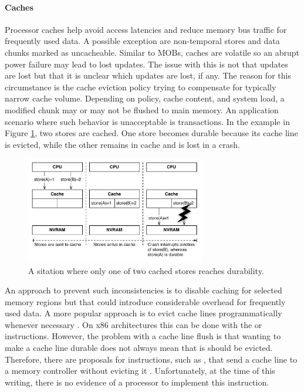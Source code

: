\paragraph{Caches}

Processor caches help avoid access latencies and reduce memory bus traffic for
frequently used data. A possible exception are non-temporal stores and data
chunks marked as uncacheable. Similar to \acp{MOB}, caches are
volatile so an abrupt power failure may lead to lost updates. The issue with
this is not that updates are lost but that it is unclear which updates are lost,
if any. The reason for this circumstance is the cache eviction policy trying to
compensate for typically narrow cache volume. Depending on policy, cache
content, and system load, a modified chunk may or may not be flushed to main
memory. An application scenario where such behavior is unacceptable is
transactions. In the example in Figure \ref{fig:nvram-cache-crash}, two stores are cached. One store becomes durable because its cache line is evicted, while the other remains in cache and is lost in a crash.



\begin{figure}[!ht]
    \centering
    \includegraphics[width=0.70\textwidth]{figures/nvram/cache-crash.pdf}
    \caption{A sitation where only one of two cached stores reaches durability.}
    \label{fig:nvram-cache-crash}
\end{figure}

An approach to prevent such inconsistencies is to disable caching for selected
memory regions but that could introduce considerable overhead for frequently
used data. A more popular approach is to evict cache lines programmatically
whenever necessary \cite{condit2009better, dulloor2014system, oukid2017data}. On
x86 architectures this can be done with the  or 
instructions. However, the problem with a cache line flush is that wanting to
make a cache line durable does not always mean that is should be evicted.
Therefore, there are proposals for instructions, such as , that send
a cache line to a memory controller without evicting it \cite{kolli2016high,
oukid2017data}. Unfortunately, at the time of this writing, there is no evidence
of a processor to implement this instruction.

